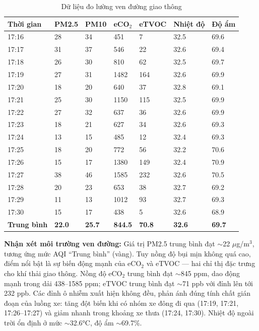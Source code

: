 \documentclass[../DoAn.tex]{subfiles}
\begin{document}
\begin{table}[H]
\centering
\caption{Dữ liệu đo lường ven đường giao thông}
\label{table:thuc_nghiem_ngoai_duong}
\small
\begin{tabularx}{\textwidth}{|X|X|X|X|X|X|X|}
\hline
\textbf{Thời gian} & \textbf{PM2.5} & \textbf{PM10} & \textbf{eCO$_2$} & \textbf{eTVOC} & \textbf{Nhiệt độ} & \textbf{Độ ẩm} \\
\hline
17:16 & 28 & 34 & 451 & 7 & 32.5 & 69.6 \\
\hline
17:17 & 31 & 37 & 546 & 22 & 32.6 & 69.4 \\
\hline
17:18 & 26 & 30 & 810 & 62 & 32.5 & 69.7 \\
\hline
17:19 & 27 & 31 & 1482 & 164 & 32.6 & 69.9 \\
\hline
17:20 & 18 & 20 & 640 & 37 & 32.8 & 69.1 \\
\hline
17:21 & 25 & 30 & 1150 & 115 & 32.5 & 69.9 \\
\hline
17:22 & 27 & 32 & 637 & 36 & 32.6 & 69.9 \\
\hline
17:23 & 18 & 21 & 627 & 34 & 32.6 & 69.3 \\
\hline
17:24 & 13 & 15 & 485 & 12 & 32.4 & 69.3 \\
\hline
17:25 & 18 & 20 & 772 & 56 & 32.2 & 70.6 \\
\hline
17:26 & 15 & 17 & 1380 & 149 & 32.4 & 70.9 \\
\hline
17:27 & 38 & 46 & 1585 & 232 & 32.6 & 70.5 \\
\hline
17:28 & 20 & 23 & 653 & 38 & 32.7 & 69.2 \\
\hline
17:29 & 11 & 13 & 1012 & 93 & 32.7 & 69.3 \\
\hline
17:30 & 15 & 17 & 438 & 5 & 32.6 & 68.9 \\
\hline
\textbf{Trung bình} & \textbf{22.0} & \textbf{25.7} & \textbf{844.5} & \textbf{70.8} & \textbf{32.6} & \textbf{69.7} \\
\hline
\end{tabularx}
\end{table}

\textbf{Nhận xét môi trường ven đường:} Giá trị PM2.5 trung bình đạt $\sim$22 $\mu$g/m$^3$, tương ứng mức AQI ``Trung bình'' (vàng). Tuy nồng độ bụi mịn không quá cao, điểm nổi bật là sự biến động mạnh của eCO$_2$ và eTVOC — hai chỉ thị đặc trưng cho khí thải giao thông. Nồng độ eCO$_2$ trung bình đạt $\sim$845 ppm, dao động mạnh trong dải 438--1585 ppm; eTVOC trung bình đạt $\sim$71 ppb với đỉnh lên tới 232 ppb. Các đỉnh ô nhiễm xuất hiện không đều, phản ánh đúng tính chất gián đoạn của luồng xe: tăng đột biến khi có nhóm xe đông đi qua (17:19, 17:21, 17:26--17:27) và giảm nhanh trong khoảng xe thưa (17:24, 17:30). Nhiệt độ ngoài trời ổn định ở mức $\sim$32.6°C, độ ẩm $\sim$69.7\%.
\end{document}
